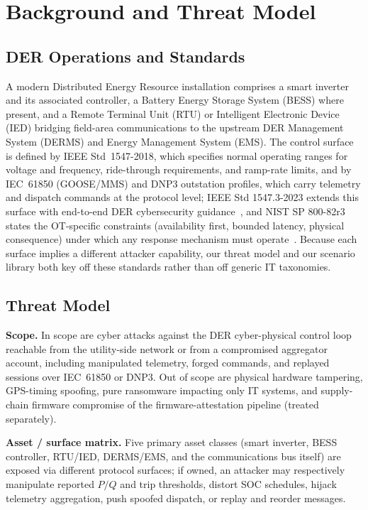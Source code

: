 \section{Background and Threat Model}
\label{sec:background}

\subsection{DER Operations and Standards}
\label{sec:bg-der}
A modern Distributed Energy Resource installation comprises a smart inverter
and its associated controller, a Battery Energy Storage System (BESS) where
present, and a Remote Terminal Unit (RTU) or Intelligent Electronic Device
(IED) bridging field-area communications to the upstream DER Management
System (DERMS) and Energy Management System (EMS). The control surface is
defined by IEEE Std~1547-2018, which specifies normal operating ranges for
voltage and frequency, ride-through requirements, and ramp-rate limits, and
by IEC~61850 (GOOSE/MMS) and DNP3 outstation profiles, which carry
telemetry and dispatch commands at the protocol level; IEEE Std
1547.3-2023 extends this surface with end-to-end DER cybersecurity
guidance~\cite{IEEE15473_2023}, and NIST SP 800-82r3 states the
OT-specific constraints (availability first, bounded latency, physical
consequence) under which any response mechanism must
operate~\cite{NIST80082r3}. Because each surface implies a different
attacker capability, our threat model and our scenario library both key
off these standards rather than off generic IT taxonomies.

\subsection{Threat Model}
\label{sec:bg-threat}
\textbf{Scope.} In scope are cyber attacks against the DER cyber-physical
control loop reachable from the utility-side network or from a compromised
aggregator account, including manipulated telemetry, forged commands, and
replayed sessions over IEC~61850 or DNP3. Out of scope are physical
hardware tampering, GPS-timing spoofing, pure ransomware impacting only
IT systems, and supply-chain firmware compromise of the firmware-attestation
pipeline (treated separately).

\textbf{Asset / surface matrix.} Five primary asset classes (smart inverter,
BESS controller, RTU/IED, DERMS/EMS, and the communications bus itself) are
exposed via different protocol surfaces; if owned, an attacker may
respectively manipulate reported $P/Q$ and trip thresholds, distort SOC
schedules, hijack telemetry aggregation, push spoofed dispatch, or replay
and reorder messages.


